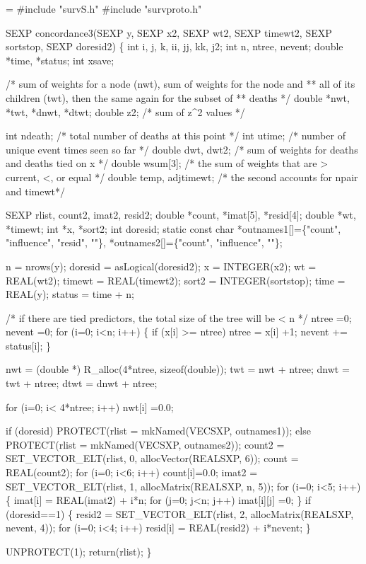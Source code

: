 \documentclass{article}
\begin{document}
\begin{nwchunk}
=
 #include "survS.h"
 #include "survproto.h"
 
     
 SEXP concordance3(SEXP y, SEXP x2, SEXP wt2, SEXP timewt2, 
                       SEXP sortstop, SEXP doresid2) \{
     int i, j, k, ii, jj, kk, j2;
     int n, ntree, nevent;
     double *time, *status;
     int xsave;
 
     /* sum of weights for a node (nwt), sum of weights for the node and
     **  all of its children (twt), then the same again for the subset of
     **  deaths
     */
     double *nwt, *twt, *dnwt, *dtwt;
     double z2;  /* sum of z^2 values */    
         
     int ndeath;   /* total number of deaths at this point */    
     int utime;    /* number of unique event times seen so far */
     double dwt, dwt2;   /* sum of weights for deaths and deaths tied on x */
     double wsum[3]; /* the sum of weights that are > current, <, or equal  */
     double temp, adjtimewt;  /* the second accounts for npair and timewt*/
 
     SEXP rlist, count2, imat2, resid2;
     double *count, *imat[5], *resid[4];
     double *wt, *timewt;
     int    *x, *sort2;
     int doresid;
     static const char *outnames1[]=\{"count", "influence", "resid", ""\},
                       *outnames2[]=\{"count", "influence", ""\};
       
     n = nrows(y);
     doresid = asLogical(doresid2);
     x = INTEGER(x2);
     wt = REAL(wt2);
     timewt = REAL(timewt2);
     sort2 = INTEGER(sortstop);
     time = REAL(y);
     status = time + n;
    
     /* if there are tied predictors, the total size of the tree will be < n */
     ntree =0; nevent =0;
     for (i=0; i<n; i++) \{
         if (x[i] >= ntree) ntree = x[i] +1;  
         nevent += status[i];
     \}
         
     nwt = (double *) R_alloc(4*ntree, sizeof(double));
     twt = nwt + ntree;
     dnwt = twt + ntree;
     dtwt = dnwt + ntree;
     
     for (i=0; i< 4*ntree; i++) nwt[i] =0.0;
     
     if (doresid) PROTECT(rlist = mkNamed(VECSXP, outnames1));
     else  PROTECT(rlist = mkNamed(VECSXP, outnames2));
     count2 = SET_VECTOR_ELT(rlist, 0, allocVector(REALSXP, 6));
     count = REAL(count2); 
     for (i=0; i<6; i++) count[i]=0.0;
     imat2 = SET_VECTOR_ELT(rlist, 1, allocMatrix(REALSXP, n, 5));
     for (i=0; i<5; i++) \{
         imat[i] = REAL(imat2) + i*n;
         for (j=0; j<n; j++) imat[i][j] =0;
     \}
     if (doresid==1) \{
         resid2 = SET_VECTOR_ELT(rlist, 2, allocMatrix(REALSXP, nevent, 4));
         for (i=0; i<4; i++) resid[i] = REAL(resid2) + i*nevent;
         \}
     
         
     UNPROTECT(1);
     return(rlist);
 \}
\end{nwchunk}
\end{document}
